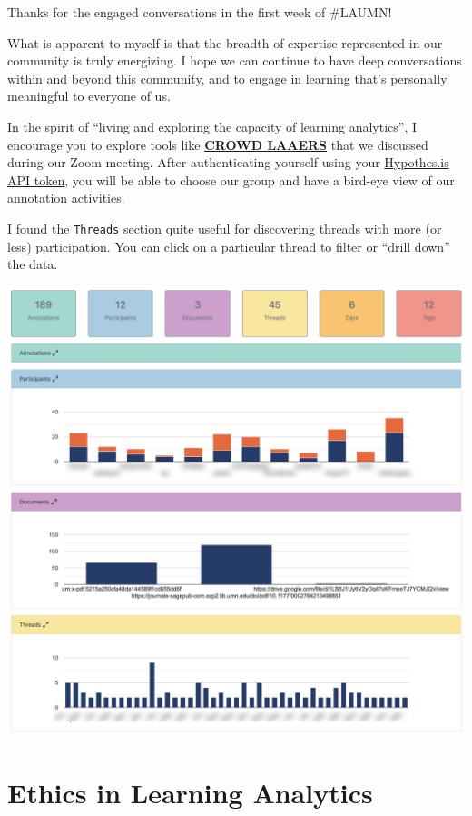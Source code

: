 \documentclass[
]{book}
\begin{document}
Thanks for the engaged conversations in the first week of \#LAUMN!

What is apparent to myself is that the breadth of expertise represented in our community is truly energizing. I hope we can continue to have deep conversations within and beyond this community, and to engage in learning that's personally meaningful to everyone of us.

In the spirit of ``living and exploring the capacity of learning analytics'', I encourage you to explore tools like \href{https://crowdlaaers.org/}{\textbf{CROWD LAAERS}} that we discussed during our Zoom meeting. After authenticating yourself using your \href{https://hypothes.is/account/developer}{Hypothes.is API token}, you will be able to choose our group and have a bird-eye view of our annotation activities.

I found the \texttt{Threads} section quite useful for discovering threads with more (or less) participation. You can click on a particular thread to filter or ``drill down'' the data.

\includegraphics{img/crowdlaaers-2020.png}

\hypertarget{ethics-in-learning-analytics}{%
\section{Ethics in Learning Analytics}\label{ethics-in-learning-analytics}}
\end{document}
